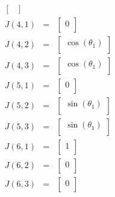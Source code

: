 \begin{eqnarray}
\begin{bmatrix}
\end{bmatrix}
 \nonumber \\J(4,1)&=&\begin{bmatrix}
0\\ 
\end{bmatrix}
 \nonumber \\J(4,2)&=&\begin{bmatrix}
\cos(\theta_1)\\ 
\end{bmatrix}
 \nonumber \\J(4,3)&=&\begin{bmatrix}
\cos(\theta_1)\\ 
\end{bmatrix}
 \nonumber \\J(5,1)&=&\begin{bmatrix}
0\\ 
\end{bmatrix}
 \nonumber \\J(5,2)&=&\begin{bmatrix}
\sin(\theta_1)\\ 
\end{bmatrix}
 \nonumber \\J(5,3)&=&\begin{bmatrix}
\sin(\theta_1)\\ 
\end{bmatrix}
 \nonumber \\J(6,1)&=&\begin{bmatrix}
1\\ 
\end{bmatrix}
 \nonumber \\J(6,2)&=&\begin{bmatrix}
0\\ 
\end{bmatrix}
 \nonumber \\J(6,3)&=&\begin{bmatrix}
0\\ 
\end{bmatrix}
 \nonumber\end{eqnarray}
